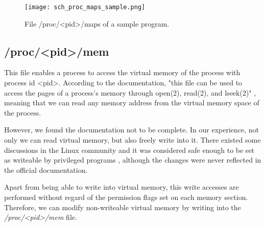 \begin{figure}[htbp]
	\centering
	\texttt{[image: sch\_proc\_maps\_sample.png]}
	\caption{File /proc/<pid>/maps of a sample program.}
	\label{fig:proc_maps_sample}
\end{figure}

\subsection{/proc/<pid>/mem}
This file enables a process to access the virtual memory of the process with process id <pid>. According to the documentation, "this file can be used to access the pages of a process's memory through open(2), read(2), and lseek(2)" \cite{proc_fs}, meaning that we can read any memory address from the virtual memory space of the process.

However, we found the documentation not to be complete. In our experience, not only we can read virtual memory, but also freely write into it. There existed some discussions in the Linux community and it was considered safe enough to be set as writeable by privileged programs \cite{proc_mem_write}, although the changes were never reflected in the official documentation.

Apart from being able to write into virtual memory, this write accesses are performed without regard of the permission flags set on each memory section. Therefore, we can modify non-writeable virtual memory by writing into the \textit{/proc/<pid>/mem} file.

